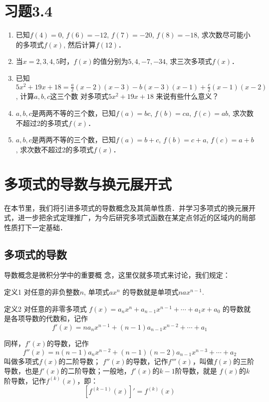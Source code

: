     \section*{习题3.4}
    \begin{enumerate}
        \item 已知$f(4)=0$, $f(6)=-12$, $f(7)=-20$,
        $f(8)=-18$, 求次数尽可能小的多项式$f(x)$, 然后计算$f(12)$．
        \item 当$x=2, 3, 4, 5$时，$f(x)$的值分别为$5, 4,-7,-34$, 求三次多项式$f(x)$．
        \item 已知$5x^2+19x+18=\frac{a}{2}(x-2)(x-3)-b(x-3)(x-1)+\frac{c}{2}(x-1)(x-2)$, 计算$a,b,c$这三个数
        对多项式$5x^2+19x+18$ 来说有些什么意义？
        \item $a,b,c$是两两不等的三个数，已知$f(a)=bc$, $f(b)=
        ca$, $f(c)=ab$, 求次数不超过2的多项式$f(x)$．
        \item $a,b,c$是两两不等的三个数，已知$f(a)=b+c$, $f(b)=
        c+a$, $f(c)=a+b$, 求次数不超过2的多项式$f(x)$．
    \end{enumerate}
    
    \section{多项式的导数与换元展开式}
    在本节里，我们将引进多项式的导数概念及其简单性质．并学习多项式的换元展开式，进一步把余式定理推广，为今后研究多项式函数在某定点邻近的区域内的局部性质打下一定基础．
    
    \subsection{多项式的导数}
    导数概念是微积分学中的重要概
    念，这里仅就多项式来讨论，我们规定：
    
\begin{blk}{定义1}
对任意的非负整数$n$, 单项式$ax^n$
的导数就是单项式$nax^{n-1}$.
\end{blk}    

     
\begin{blk}{定义2}
对任意的非零多项式
$f (x) =a_nx^n+a_{n-1}x^{n-1}+\cdots+a_1x+a_0$
的导数就是各项导数的代数和，记作
\[f' (x) =na_nx^{n-1}+(n-1)a_{n-1}x^{n-2}+\cdots +a_1\]

同样，$f'(x)$的导数，记作
\[f'' (x) =n (n-1) a_nx^{n-2} + (n-1) (n-2)a_{n-1}x^{n-3}+\cdots+a_2\]
叫做多项式$f(x)$的二阶导数；
$f''(x)$的导数，记作$f'''(x)$，叫做$f(x)$的三阶导数，也是$f'(x)$的二阶导数；一般地，$f'(x)$的$k-1$阶导数，就是
$f(x)$的$k$阶导数，记作$f^{(k)}(x)$，即：
\[\left[f^{(k-1)} (x)\right]'=f^{(k)}(x)\]
\end{blk}    

